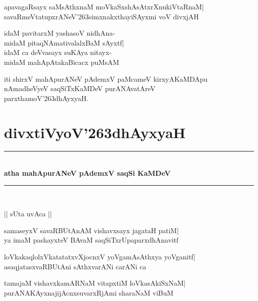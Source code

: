 \documentclass[twoside,12pt,openright]{book}
\def\S{\char'263}
\newcounter{shloka}[chapter]
\begin{document}
\begin{shloka}%
apavagaRsayx saMsAthxnaM moVkaSxshAsAtxrXnukiVtaRnaM|\\
savaRmeVtatupxrANeV\S simxnakxthayiSAyxmi voV divxjAH
\end{shloka}

\begin{shloka}%
idaM pavitarxM yashasoV nidhAna-\\
midaM pitaqNAmativalalxBaM sAyxtf|\\
idaM ca deVvasayx suKAya nitayx-\\
midaM mahApAtakaBicacx puMsAM
\end{shloka}

\begin{center}
iti shirxV mahApurANeV pAdemxV paMcameV kirxyAKaMDApu\\
nAmadheVyeV saqSiTxKaMDeV purANAvatAreV\\
parxthamoV\S dhAyxyaH.
\end{center}


\chapter{divxtiVyoV\S dhAyxyaH}
\begin{center}
\rule{2cm}{1pt}\\[.5cm]
{\LARGE\bfseries atha mahApurANeV pAdemxV saqSi KaMDeV}\\[.3cm]
\rule{2cm}{1pt}\\
\end{center}

\begin{center}
|| sUta uvAca ||
\end{center}
\begin{shloka}%
samaseyxV savaRBUtAnAM vishavxsayx jagataH patiM|\\
ya imaM pashayxteV BAvaM saqSiTxrUpaparxdhAnavitf
\end{shloka}

\begin{shloka}%
loVkakaqlolxVkatatatxvXjocnxV yoVgamAsAthxya yoVganitf|\\
asaqjatasxvaRBUtAni sAthxvarANi carANi ca
\end{shloka}

\begin{shloka}%
tamajaM vishavxkamARNaM vitapxtiM loVkasAkiSxNaM|\\
purANAKAyxnajijAcnxsuvarxRjAmi sharaNaM viBuM
\end{shloka}
\end{document}
